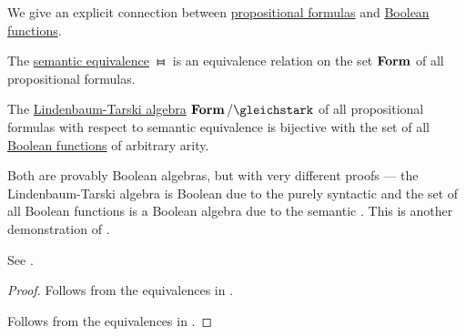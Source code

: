 \begin{theorem}\label{thm:lindenmaum_tarski_algebra_of_full_propositional_logic}
  We give an explicit connection between \hyperref[def:propositional_syntax/formula]{propositional formulas} and \hyperref[def:boolean_function]{Boolean functions}.

  \begin{thmenum}
     The \hyperref[def:propositional_semantics/equivalence]{semantic equivalence} \( \gleichstark \) is an equivalence relation on the set \( \operatorname{\mathbf{Form}} \) of all propositional formulas.

     The \hyperref[def:lindenbaum_tarski_algebra]{Lindenbaum-Tarski algebra}  \( \boldop{Form} / {{}\gleichstark} \) of all propositional formulas with respect to semantic equivalence is bijective with the set of all \hyperref[def:boolean_function]{Boolean functions} of arbitrary arity.

    Both are provably Boolean algebras, but with very different proofs --- the Lindenbaum-Tarski algebra is Boolean due to the purely syntactic  and the set of all Boolean functions is a Boolean algebra due to the semantic . This is another demonstration of .

    See .
  \end{thmenum}
\end{theorem}
\begin{proof}
   Follows from the equivalences in .

   Follows from the equivalences in .
\end{proof}

